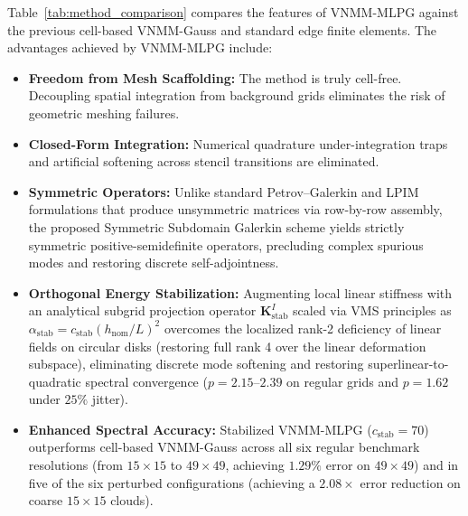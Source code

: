 \documentclass[VANCOUVER,Times1COL]{WileyNJD-v5}
\begin{document}
Table~\ref{tab:method_comparison} compares the features of VNMM-MLPG against the previous cell-based VNMM-Gauss and standard edge finite elements. The advantages achieved by VNMM-MLPG include:
\begin{itemize}
    \item \textbf{Freedom from Mesh Scaffolding:} The method is truly cell-free. Decoupling spatial integration from background grids eliminates the risk of geometric meshing failures.
    \item \textbf{Closed-Form Integration:} Numerical quadrature under-integration traps and artificial softening across stencil transitions are eliminated.
    \item \textbf{Symmetric Operators:} Unlike standard Petrov--Galerkin and LPIM formulations that produce unsymmetric matrices via row-by-row assembly, the proposed Symmetric Subdomain Galerkin scheme yields strictly symmetric positive-semidefinite operators, precluding complex spurious modes and restoring discrete self-adjointness.
    \item \textbf{Orthogonal Energy Stabilization:} Augmenting local linear stiffness with an analytical subgrid projection operator $\mathbf{K}_{\mathrm{stab}}^I$ scaled via VMS principles as $\alpha_{\mathrm{stab}} = c_{\mathrm{stab}}(h_{\mathrm{nom}}/L)^2$ overcomes the localized rank-2 deficiency of linear fields on circular disks (restoring full rank 4 over the linear deformation subspace), eliminating discrete mode softening and restoring superlinear-to-quadratic spectral convergence ($p = 2.15\text{--}2.39$ on regular grids and $p = 1.62$ under $25\%$ jitter).
    \item \textbf{Enhanced Spectral Accuracy:} Stabilized VNMM-MLPG ($c_{\mathrm{stab}} = 70$) outperforms cell-based VNMM-Gauss across all six regular benchmark resolutions (from $15\times 15$ to $49\times 49$, achieving $1.29\%$ error on $49\times 49$) and in five of the six perturbed configurations (achieving a $2.08\times$ error reduction on coarse $15\times 15$ clouds).
\end{itemize}
\end{document}
